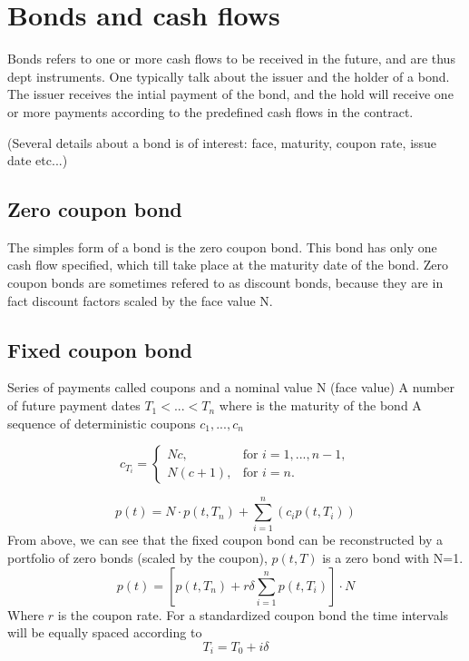 \documentclass[11pt,a4paper]{article}
\numberwithin{equation}{section}
\begin{document}

	\section{Bonds and cash flows}
	Bonds refers to one or more cash flows to be received in the future, and are thus dept instruments. One typically talk about the issuer and the holder of a bond. The issuer receives the intial payment of the bond, and the hold will receive one or more payments according to the predefined cash flows in the contract.

	(Several details about a bond is of interest: face, maturity, coupon rate, issue date etc...)

	\label{sec:fi}

	\subsection{Zero coupon bond}
	The simples form of a bond is the zero coupon bond. This bond has only one cash flow specified, which till take place at the maturity date of the bond. Zero coupon bonds are sometimes refered to as discount bonds, because they are in fact discount factors scaled by the face value N.


	\subsection{Fixed coupon bond}
	Series of payments called coupons and a nominal value N (face value)
	A number of future payment dates $T_1 < ... < T_n$ where is the maturity of the bond
	A sequence of deterministic coupons $c_1, ..., c_n$

	\[ c_{T_i} = \left\{
	\begin{array}{ll}
	  Nc, & \text{for } i=1,...,n-1,  \\
	  N(c+1), &\text{for } i=n.
	\end{array} \right.\]

	\[
	p(t) = N \cdot p(t,T_n)+\sum_{i=1}^{n} (c_ip(t,T_i))
	\]
	From above, we can see that the fixed coupon bond can be reconstructed by a portfolio of zero
	bonds (scaled by the coupon), $p(t,T)$ is a zero bond with N=1.
	\[
	p(t)=\left[p(t,T_n)+r\delta\sum_{i=1}^{n} p(t,T_i)\right]\cdot N
	\]
	Where $r$ is the coupon rate. For a standardized coupon bond the time intervals will be equally
	spaced according to
	\[
	T_i=T_0+i\delta
	\]
\end{document}
